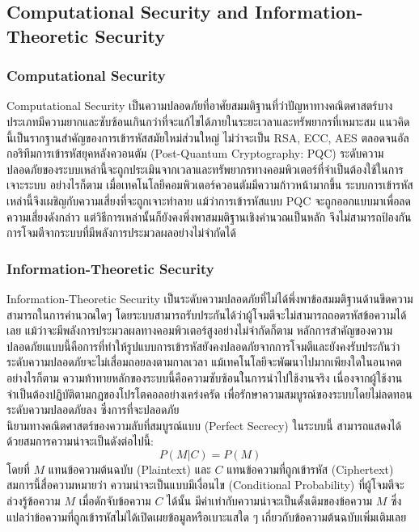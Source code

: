 \subsection{Computational Security and Information-Theoretic Security}

\subsubsection{Computational Security}
Computational Security เป็นความปลอดภัยที่อาศัยสมมติฐานที่ว่าปัญหาทางคณิตศาสตร์บางประเภทมีความยากและซับซ้อนเกินกว่าที่จะแก้ไขได้ภายในระยะเวลาและทรัพยากรที่เหมาะสม 
แนวคิดนี้เป็นรากฐานสำคัญของการเข้ารหัสสมัยใหม่ส่วนใหญ่ ไม่ว่าจะเป็น RSA, ECC, AES 
ตลอดจนอัลกอริทึมการเข้ารหัสยุคหลังควอนตัม (Post-Quantum Cryptography: PQC) ระดับความปลอดภัยของระบบเหล่านี้จะถูกประเมินจากเวลาและทรัพยากรทางคอมพิวเตอร์ที่จำเป็นต้องใช้ในการเจาะระบบ 
อย่างไรก็ตาม เมื่อเทคโนโลยีคอมพิวเตอร์ควอนตัมมีความก้าวหน้ามากขึ้น ระบบการเข้ารหัสเหล่านี้จึงเผชิญกับความเสี่ยงที่จะถูกเจาะทำลาย 
แม้ว่าการเข้ารหัสแบบ PQC จะถูกออกแบบมาเพื่อลดความเสี่ยงดังกล่าว แต่วิธีการเหล่านั้นก็ยังคงพึ่งพาสมมติฐานเชิงคำนวณเป็นหลัก จึงไม่สามารถป้องกันการโจมตีจากระบบที่มีพลังการประมวลผลอย่างไม่จำกัดได้


\subsubsection{Information-Theoretic Security}
Information-Theoretic Security เป็นระดับความปลอดภัยที่ไม่ได้พึ่งพาข้อสมมติฐานด้านขีดความสามารถในการคำนวณใดๆ 
โดยระบบสามารถรับประกันได้ว่าผู้โจมตีจะไม่สามารถถอดรหัสข้อความได้เลย แม้ว่าจะมีพลังการประมวลผลทางคอมพิวเตอร์สูงอย่างไม่จำกัดก็ตาม 
หลักการสำคัญของความปลอดภัยเแบบนี้คือการที่ทำให้รูปแบบการเข้ารหัสยังคงปลอดภัยจากการโจมตีและยังคงรับประกันว่าระดับความปลอดภัยจะไม่เสื่อมถอยลงตามกาลเวลา 
แม้เทคโนโลยีจะพัฒนาไปมากเพียงใดในอนาคต อย่างไรก็ตาม ความท้าทายหลักของระบบนี้คือความซับซ้อนใ่นการนำไปใช้งานจริง
เนื่องจากผู้ใช้งานจำเป็นต้องปฏิบัติตามกฎของโปรโตคอลอย่างเคร่งครัด เพื่อรักษาความสมบูรณ์ของระบบโดยไม่ลดทอนระดับความปลอดภัยลง
ซึ่งการที่จะปลอดภัย\\
นิยามทางคณิตศาสตร์ของความลับที่สมบูรณ์แบบ (Perfect Secrecy) ในระบบนี้ สามารถแสดงได้ด้วยสมการความน่าจะเป็นดังต่อไปนี้:
\[P(M | C) = P(M)\]
โดยที่ $M$ แทนข้อความต้นฉบับ (Plaintext) และ $C$ แทนข้อความที่ถูกเข้ารหัส (Ciphertext) สมการนี้สื่อความหมายว่า ความน่าจะเป็นแบบมีเงื่อนไข (Conditional Probability) ที่ผู้โจมตีจะล่วงรู้ข้อความ $M$ เมื่อดักจับข้อความ $C$ ได้นั้น มีค่าเท่ากับความน่าจะเป็นดั้งเดิมของข้อความ $M$ ซึ่งแปลว่าข้อความที่ถูกเข้ารหัสไม่ได้เปิดเผยข้อมูลหรือเบาะแสใด ๆ เกี่ยวกับข้อความต้นฉบับเพิ่มเติมเลย ~\cite{shannon_secure}

